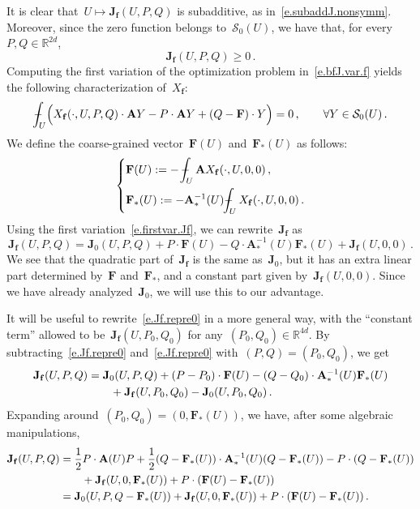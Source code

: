 \documentclass[11pt]{article} %
\numberwithin{equation}{section}
\theoremstyle{definition}
\let\originalleft\left
\let\originalright\right
\renewcommand{\left}{\mathopen{}\mathclose\bgroup\originalleft}
\renewcommand{\right}{\aftergroup\egroup\originalright}
\newcommand*{\R}{\ensuremath{\mathbb{R}}}
\newcommand{\f}{\mathbf{f}}
\renewcommand{\S}{\mathcal{S}}
\def\Xint#1{\mathchoice
{\XXint\displaystyle\textstyle{#1}}%
{\XXint\textstyle\scriptstyle{#1}}%
{\XXint\scriptstyle\scriptscriptstyle{#1}}%
{\XXint\scriptscriptstyle\scriptscriptstyle{#1}}%
\!\int}
\def\XXint#1#2#3{{\setbox0=\hbox{$#1{#2#3}{\int}$}
\vcenter{\hbox{$#2#3$}}\kern-.5\wd0}}
\def\fint{\Xint-}
\newcommand{\bfA}{\mathbf{A}}
\newcommand{\bfJ}{\mathbf{J}}
\newcommand{\bfF}{\mathbf{F}}
\begin{document}
\smallskip

 It is clear that~$U \mapsto \bfJ_\f(U,P,Q)$ is subadditive, as in~\eqref{e.subaddJ.nonsymm}. Moreover, since the zero function belongs to~$\S_0(U)$, we have that, for every~$P,Q\in \R^{2d}$,  
\begin{equation}
\label{e.bfJ.nonneg}
\bfJ_\f(U,P,Q) \geq 0\,.
\end{equation}
Computing the first variation of the optimization problem in~\eqref{e.bfJ.var.f} yields the following characterization of~$X_\f$:
\begin{equation}
\label{e.firstvar.Jf}
\fint_U 
\Bigl( 
X_\f(\cdot,U,P,Q) 
\cdot \bfA Y
-P\cdot \bfA Y
+(Q-\bfF) \cdot Y
\Bigr) = 0\,, 
\qquad \forall Y \in \S_0(U)\,.
\end{equation}
We define the coarse-grained vector~$\bfF(U)$ and~$\bfF_*(U)$ as follows:
\begin{equation} \label{e.coarseF.def}
\left\{
\begin{aligned}
& \bfF(U) 
:=
-\,
\fint_{U} \bfA X_\f(\cdot,U,0,0) \,,
\\ & 
\bfF_*(U) 
:=
-\bfA_*^{-1}(U) \fint_{U} X_\f(\cdot,U,0,0)\,.
\end{aligned}
\right.
\end{equation}
Using the first variation~\eqref{e.firstvar.Jf}, we can rewrite~$\bfJ_\f$ as
\begin{equation} 
\label{e.Jf.repre0}
\bfJ_\f(U, P,Q ) 
=  
\bfJ_0(U, P,Q )  
+ P\cdot \bfF(U) 
- Q \cdot \bfA_*^{-1}(U) \bfF_*(U)  
+ \bfJ_\f(U, 0,0) 
\,.
\end{equation}
We see that the quadratic part of~$\bfJ_\f$ is the same as~$\bfJ_0$, but it has an extra linear part determined by~$\bfF$ and~$\bfF_*$, and a constant part given by~$\bfJ_\f(U,0,0)$.
Since we have already analyzed~$\bfJ_0$, we will use this to our advantage. 

\smallskip

It will be useful to rewrite~\eqref{e.Jf.repre0} in a more general way, with the ``constant term'' allowed to be~$\bfJ_\f(U,P_0,Q_0)$ for any~$(P_0,Q_0)\in\R^{4d}$. By subtracting~\eqref{e.Jf.repre0} and~\eqref{e.Jf.repre0} with~$(P,Q)=(P_0,Q_0)$, we get
\begin{align}
\label{e.Jf.repre.gen}
\bfJ_\f(U,P,Q) 
&
=
\bfJ_0 (U,P,Q) 
+ (P - P_0) \cdot \bfF(U)
- (Q - Q_0) \cdot \bfA_*^{-1}(U) \bfF_*(U) 
\notag \\ & \qquad 
+ \bfJ_\f(U,P_0,Q_0) - \bfJ_0 (U,P_0,Q_0)  \,.
\end{align}
Expanding around~$(P_0,Q_0)=(0,\bfF_*(U))$, we have, after some algebraic manipulations,  
\begin{align} 
\label{e.Jf.repre0zoop}
\bfJ_\f(U, P,Q ) 
&
=
\frac 12 P \cdot \bfA(U) P 
+
\frac12 (Q-\bfF_*(U)  ) \cdot \bfA_*^{-1}(U) (Q-\bfF_*(U)  )
-
P \cdot (Q-\bfF_*(U))
\notag \\ & \qquad 
+ 
\bfJ_\f(U,0,\bfF_*(U) )
+ P \cdot (\bfF(U)-\bfF_*(U))
\\ & \label{e.Jf.repre0zoopie}
=
\bfJ_0(U,P,Q-\bfF_*(U)) + 
\bfJ_\f(U,0,\bfF_*(U) )
+ P \cdot (\bfF(U)-\bfF_*(U))
\,.
\end{align}
\end{document}
